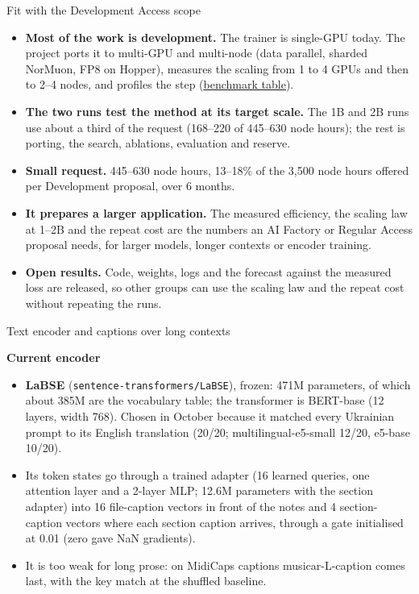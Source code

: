 \documentclass[11pt,a4paper]{article}
\makeatletter
\newcommand{\seclink}[2]{\hyperref[#1]{\textcolor{blue!60!black}{\underline{#2}}}}
\renewcommand\subsection{\@startsection{subsection}{2}{\z@}{-2.6ex \@plus -1ex \@minus -.2ex}{1.2ex \@plus .2ex}%
  {\normalfont\large\bfseries\color{head}}}
\makeatother
\begin{document}
\subsection{Fit with the Development Access scope}

\begin{itemize}
\item \textbf{Most of the work is development.} The trainer is single-GPU today. The project ports it to multi-GPU
and multi-node (data parallel, sharded NorMuon, FP8 on Hopper), measures the scaling from 1 to 4 GPUs and then to
2--4 nodes, and profiles the step (\seclink{sec:scal}{benchmark table}).
\item \textbf{The two runs test the method at its target scale.} The 1B and 2B runs use about a third of the request
(168--220 of 445--630 node hours); the rest is porting, the search, ablations, evaluation and reserve.
\item \textbf{Small request.} 445--630 node hours, 13--18\% of the 3,500 node hours offered per Development proposal,
over 6 months.
\item \textbf{It prepares a larger application.} The measured efficiency, the scaling law at 1--2B and the repeat cost
are the numbers an AI Factory or Regular Access proposal needs, for larger models, longer contexts or encoder
training.
\item \textbf{Open results.} Code, weights, logs and the forecast against the measured loss are released, so other
groups can use the scaling law and the repeat cost without repeating the runs.
\end{itemize}

\subsection{Text encoder and captions over long contexts}\label{sec:encoder}

\textbf{Current encoder}
\begin{itemize}
\item \textbf{LaBSE} (\texttt{sentence-transformers/LaBSE}), frozen: 471M parameters, of which about 385M are the
vocabulary table; the transformer is BERT-base (12 layers, width 768). Chosen in October because it matched every
Ukrainian prompt to its English translation (20/20; multilingual-e5-small 12/20, e5-base 10/20).
\item Its token states go through a trained adapter (16 learned queries, one attention layer and a 2-layer MLP;
12.6M parameters with the section adapter) into 16 file-caption vectors in front of the notes and 4 section-caption
vectors where each section caption arrives, through a gate initialised at 0.01 (zero gave NaN gradients).
\item It is too weak for long prose: on MidiCaps captions musicar-L-caption comes last, with the key match at the
shuffled baseline.
\end{itemize}
\end{document}
